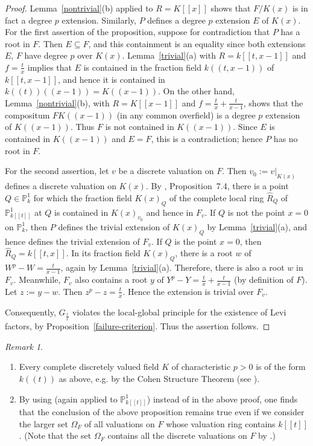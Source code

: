 \documentclass[12pt]{amsart}
\newcommand{\wh}{\widehat}
\theoremstyle{plain}
\theoremstyle{definition}
\theoremstyle{remark}
\newtheorem{rem}[thm]{Remark}
\begin{document}
\begin{proof}
Lemma~\ref{nontrivial}(b) applied to $R=K[[x]]$ shows that $F/K(x)$ is in fact a degree $p$ extension. Similarly, $P$ defines a degree $p$ extension $E$ of $K(x)$. For the first assertion of the proposition, suppose for contradiction that $P$ has a root in $F$.  Then $E \subseteq F$, and this containment is an equality since both extensions $E$, $F$ have degree $p$ over $K(x)$.   
Lemma~\ref{trivial}(a) with $R=k[[t,x-1]]$ and $f=\frac{t}{x}$ implies that 
$E$ is contained in the fraction field $k((t,x-1))$ of $k[[t,x-1]]$, and hence it is contained in $k((t))((x-1)) = K((x-1))$.  
On the other hand, Lemma~\ref{nontrivial}(b), with $R=K[[x-1]]$ and $f=\frac{t}{x}+\frac{t}{x-1}$, shows that the compositum $FK((x-1))$ (in any common overfield) is a degree $p$ extension of $K((x-1))$.   Thus $F$ is not contained in $K((x-1))$.  Since $E$ is contained in $K((x-1))$ and $E=F$, this is a contradiction; hence $P$ has no root in $F$.

For the second assertion, let $v$ be a discrete valuation on $F$. Then $v_0:=v|_{K(x)}$ defines a discrete valuation on $K(x)$. By \cite{HHK:H1}, Proposition~7.4, there is a point $Q\in {\mathbb P}^1_k$ for which the fraction field $K(x)_Q$ of the complete local ring $\wh R_Q$ of ${\mathbb P}^1_{k[[t]]}$ at $Q$ is contained in $K(x)_{v_0}$ and hence in $F_v$. If $Q$ is not the point $x=0$ on ${\mathbb P}^1_k$, then $P$ defines the trivial extension of $K(x)_Q$ by Lemma~\ref{trivial}(a), and hence defines the trivial extension of $F_v$. If $Q$ is the point $x=0$, then $\wh R_Q=k[[t,x]]$. In its fraction field $K(x)_Q$, there is a root $w$ of $W^p-W=\frac{t}{x-1}$, again by Lemma~\ref{trivial}(a). Therefore, there is also a root $w$ in $F_v$. Meanwhile, $F_v$ also contains a root $y$ of $Y^p-Y=\frac{t}{x}+\frac{t}{x-1}$ (by definition of $F$). Let $z:=y-w$. Then $z^p-z=\frac{t}{x}$. Hence the extension is trivial over $F_v$.  

Consequently, $G_{\frac{t}{x}}$ violates the local-global principle for the existence of Levi factors, by 
Proposition~\ref{failure-criterion}.  Thus the assertion follows.
\end{proof}

\begin{rem}
\begin{enumerate}
\item Every complete discretely valued field $K$ of characteristic $p>0$ is of the form $k((t))$ as above, e.g. by the Cohen Structure Theorem (see \cite[Theorem~15]{Cohen}). 
\item By using \cite[Proposition~1.4]{comparison} (again applied to ${\mathbb P}^1_{k[[t]]}$) instead of \cite[Proposition~7.4]{HHK:H1} in the above proof, one finds that the conclusion of the above proposition remains true even if we consider the larger set $\Omega_F$ of all valuations on $F$ whose valuation ring contains $k[[t]]$. (Note that the set $\Omega_F$ contains all the discrete valuations on $F$ by \cite[Corollary~7.2]{HHK:H1}.)
\end{enumerate}
\end{rem}
\end{document}
